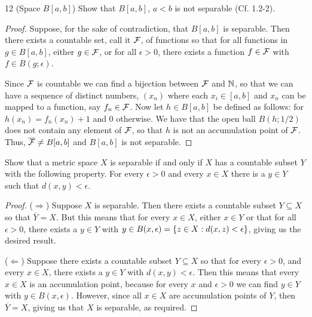 \begin{exercise}{12 (Space $B[a,b]$)}
 Show that $B[a,b]$, $a<b$ is not separable (Cf. 1.2-2).
\end{exercise}
\begin{proof}
Suppose, for the sake of contradiction, that $B[a,b]$ is separable. Then there exists a countable set, call it $\mathcal{F}$, of functions so that for all functions in $g\in B[a,b]$, either $g\in\mathcal{F}$, or for all $\epsilon>0$, there exists a function $f\in\mathcal{F}$ with $f\in B(g;\epsilon)$.

Since $\mathcal{F}$ is countable we can find a bijection between $\mathcal{F}$ and $\mathbb{N}$, so that we can have a sequence of distinct numbers, $(x_n)$ where each $x_i\in[a,b]$ and $x_n$ can be mapped to a function, say $f_n\in\mathcal{F}$. Now let $h\in B[a,b]$ be defined as follows: for $h(x_n)=f_n(x_n)+1$ and 0 otherwise. We have that the open ball $B(h;1/2)$ does not contain any element of $\mathcal{F}$, so that $h$ is not an accumulation point of $\mathcal{F}$. Thus, $\overline{\mathcal{F}}\neq B[a,b]$ and $B[a,b]$ is not separable. 
\end{proof}

\begin{exercise}{13}
Show that a metric space $X$ is separable if and only if $X$ has a countable subset $Y$ with the following property. For every $\epsilon>0$ and every $x\in X$ there is a $y\in Y$ such that $d(x,y)<\epsilon$.
\end{exercise}
\begin{proof}
($\Rightarrow$) Suppose $X$ is separable. Then there exists a countable subset $Y\subseteq X$ so that $\overline{Y}=X$. But this means that for every $x\in X$, either $x\in Y$ or that for all $\epsilon>0$, there exists a $y\in Y$ with $y\in B(x, \epsilon)=\{z\in X:d(x,z)<\epsilon\}$, giving us the desired result.

($\Leftarrow$) Suppose there exists a countable subset $Y\subseteq X$ so that for every $\epsilon>0$, and every $x\in X$, there exists a $y\in Y$ with $d(x,y)<\epsilon$. Then this means that every $x\in X$ is an accumulation point, because for every $x$ and $\epsilon>0$ we can find $y\in Y$ with $y\in B(x,\epsilon)$. However, since all $x\in X$ are accumulation points of $Y$, then $\overline{Y}=X$, giving us that $X$ is separable, as required.
\end{proof}

